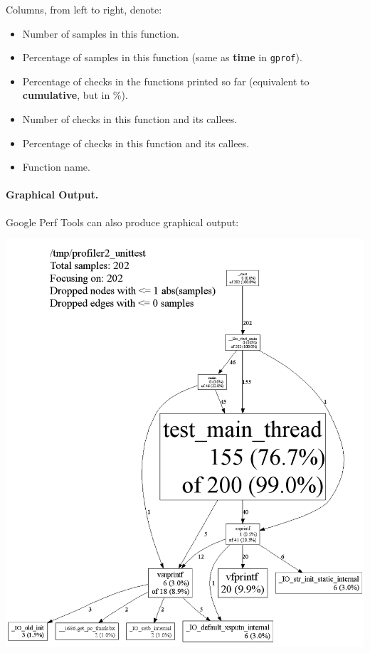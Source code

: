 Columns, from left to right, denote:
\begin{itemize}
\item  Number of samples in this function.
\item  Percentage of samples in this function (same as {\bf time} in {\tt gprof}).
\item  Percentage of checks in the functions printed so far (equivalent to {\bf cumulative}, but in \%).
\item     Number of checks in this function and its callees.
\item     Percentage of checks in this function and its callees.
\item    Function name.
\end{itemize}

\paragraph{Graphical Output.} Google Perf Tools can also produce graphical output:

\begin{center}
    \includegraphics[scale=0.3]{images/pprof-test-big.png}
\end{center}

